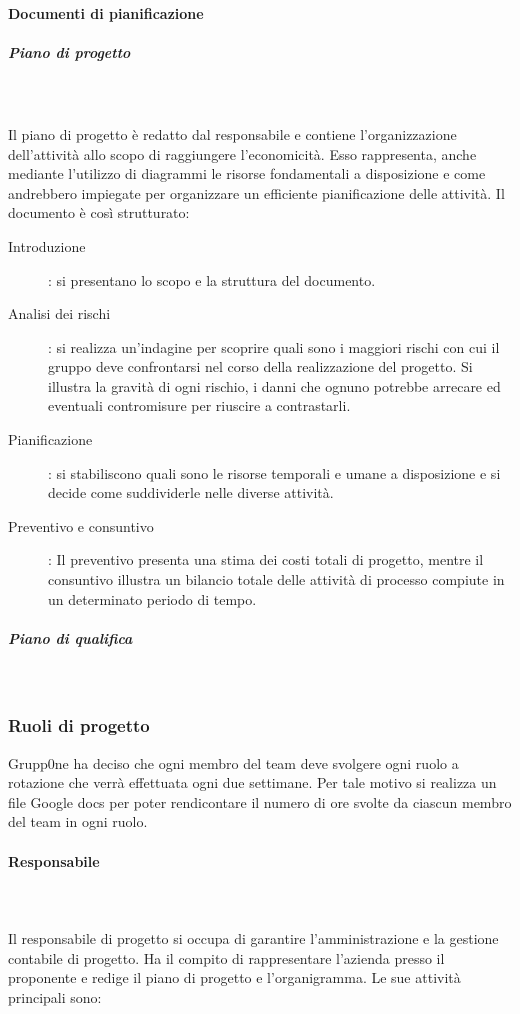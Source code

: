 \documentclass[../norme-di-progetto.tex]{subfiles}
\begin{document}
\paragraph{Documenti di pianificazione}
\label{par:documenti di pianificazione}
\subparagraph{Piano di progetto}\mbox{}\\
\label{subp:piano di progetto}
\\Il piano di progetto è redatto dal responsabile e contiene l'organizzazione dell'attività allo scopo di raggiungere l'economicità. Esso rappresenta, anche mediante l'utilizzo di diagrammi le risorse fondamentali a disposizione e come andrebbero impiegate per organizzare un efficiente pianificazione delle attività. Il documento è così strutturato:
\begin{description}
  \item [Introduzione]: si presentano lo scopo e la struttura del documento.
  \item [Analisi dei rischi]: si realizza un'indagine per scoprire quali sono i maggiori rischi con cui il gruppo deve confrontarsi nel corso della realizzazione del progetto. Si illustra la gravità di ogni rischio, i danni che ognuno potrebbe arrecare ed eventuali contromisure per riuscire a contrastarli.
  \item [Pianificazione]: si stabiliscono quali sono le risorse temporali e umane a disposizione e si decide come suddividerle nelle diverse attività.
  \item [Preventivo e consuntivo]: Il preventivo presenta una stima dei costi totali di progetto, mentre il consuntivo illustra un bilancio totale delle attività di processo compiute in un determinato periodo di tempo.
\end{description}
\subparagraph{Piano di qualifica}\mbox{}\\
\label{subp:piano di qualifica}

\subsubsection{Ruoli di progetto}%
\label{subs:ruoli di progetto}

Grupp0ne ha deciso che ogni membro del team deve svolgere ogni ruolo a rotazione che verrà effettuata ogni due settimane.
Per tale motivo si realizza un file Google docs per poter rendicontare il numero di ore svolte da ciascun membro del team in ogni ruolo.

\paragraph{Responsabile}\mbox{}\\
\label{par:responsabile}
\\Il responsabile di progetto si occupa di garantire l'amministrazione e la gestione contabile di progetto.
Ha il compito di rappresentare l'azienda presso il proponente e redige il piano di progetto e l'organigramma.
Le sue attività principali sono:
\end{document}
